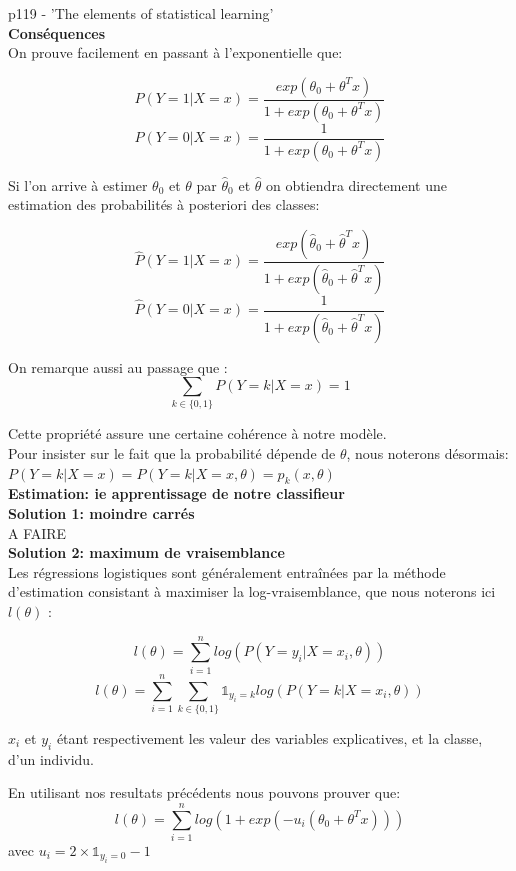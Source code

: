 \documentclass[a4paper]{article}
\theoremstyle{plain}
\begin{document}
p119 - 'The elements of statistical learning'\\

\textbf{Conséquences}\\

On prouve facilement en passant à l'exponentielle que:

$$P(Y=1|X=x) = \frac{exp(\theta_0 + \theta^T x)}{1 + exp(\theta_0 + \theta^T x)}$$
$$P(Y=0|X=x) = \frac{1}{1 + exp(\theta_0 + \theta^T x)}$$

Si l'on arrive à estimer $\theta_0$ et $\theta$ par  $\hat \theta_0$ et $\hat \theta$ on obtiendra directement une estimation des probabilités à posteriori des classes:

$$\hat P(Y=1|X=x) = \frac{exp(\hat \theta_0 + \hat \theta^T x)}{1 + exp(\hat \theta_0 + \hat \theta^T x)}$$
$$\hat P(Y=0|X=x) = \frac{1}{1 + exp(\hat \theta_0 + \hat \theta^T x)}$$


On remarque aussi au passage que :
$$ \sum_{k \in \{0,1\}} P(Y=k|X=x) = 1 $$

Cette propriété assure une certaine cohérence à notre modèle. \\

Pour insister sur le fait que la probabilité dépende de $\theta$, nous noterons désormais: $P(Y=k|X=x) = P(Y=k|X=x, \theta)=  p_k(x,\theta) $\\

\textbf{Estimation: ie apprentissage de notre classifieur}\\


\textbf{Solution 1: moindre carrés}\\
A FAIRE\\

\textbf{Solution 2: maximum de vraisemblance}\\

Les régressions logistiques sont généralement entraînées par la méthode d'estimation consistant à maximiser la log-vraisemblance, que nous noterons ici $l(\theta)$ :

$$ l(\theta) = \sum_{i=1}^n log\left(  P(Y=y_i|X=x_i, \theta)\right) $$
$$ l(\theta) = \sum_{i=1}^n \sum_{k \in \{0,1\}}\mathds{1}_{y_i=k} log\left(  P(Y=k|X=x_i, \theta)\right) $$

$x_i$ et $y_i$ étant respectivement les valeur des variables explicatives, et la classe, d'un individu.

En utilisant nos resultats précédents nous pouvons prouver que:
$$ l(\theta) = \sum_{i=1}^n log(1 + exp(-u_i (\theta_0 + \theta^T x))) $$
avec $u_i = 2 \times \mathds{1}_{y_i=0}-1$ \\
\end{document}
